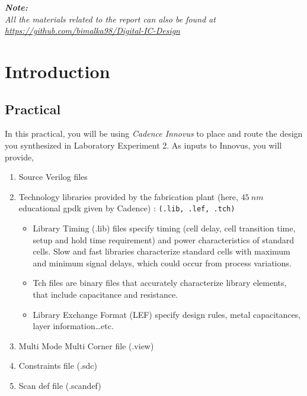\documentclass[a4paper,11pt]{article}%
\begin{document}


\pagebreak

\tableofcontents
\vfill
\textit{\textbf{Note:}}\\
\textit{All the materials related to the report can also be found at \url{https://github.com/bimalka98/Digital-IC-Design}}

\pagebreak
\listoffigures
\listoftables




\pagebreak
\section{Introduction}

\subsection{Practical}
In this practical, you will be using \textit{Cadence Innovus} to place and route the design you synthesized in Laboratory Experiment 2. As inputs to Innovus, you will provide,

\begin{enumerate}
	\item Source Verilog files
	\item Technology libraries provided by the fabrication plant (here, $45~nm$ educational \ac{gpdk} given by Cadence) : {\tt (.lib, .lef, .tch)}
	
	\begin{itemize}
		\item Library Timing (.lib) files specify timing (cell delay, cell transition time, setup and hold time requirement) and power characteristics of standard cells. Slow and fast libraries 	characterize standard cells with maximum and minimum signal delays, which could occur from process variations.

		\item Tch files are binary files that accurately characterize library elements, that include  capacitance and resistance.
		
		\item Library Exchange Format (LEF) specify design rules, metal capacitances, layer information…etc.
	\end{itemize}
	
	\item Multi Mode Multi Corner file (.view)
	\item Constraints file (.sdc)
	\item Scan \ac{def} file (.scandef)
\end{enumerate}
\end{document}
